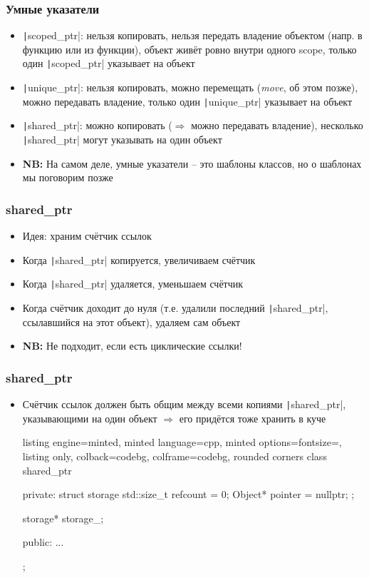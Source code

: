 \documentclass[10pt]{beamer}
\begin{document}
\begin{frame}[fragile]
\frametitle{Умные указатели}
\begin{itemize}
\item \texttt|scoped_ptr|: нельзя копировать, нельзя передать владение объектом (напр. в функцию или из функции), объект живёт ровно внутри одного scope, только один \texttt|scoped_ptr| указывает на объект
\pause
\item \texttt|unique_ptr|: нельзя копировать, можно перемещать (\textit{move}, об этом позже), можно передавать владение, только один \texttt|unique_ptr| указывает на объект
\pause
\item \texttt|shared_ptr|: можно копировать (\(\Longrightarrow\) можно передавать владение), несколько \texttt|shared_ptr| могут указывать на один объект
\pause
\item \textbf{NB:} На самом деле, умные указатели -- это шаблоны классов, но о шаблонах мы поговорим позже
\end{itemize}
\end{frame}

\begin{frame}[fragile]
\frametitle{shared\_ptr}
\begin{itemize}
\item Идея: храним счётчик ссылок
\pause
\item Когда \texttt|shared_ptr| копируется, увеличиваем счётчик
\pause
\item Когда \texttt|shared_ptr| удаляется, уменьшаем счётчик
\pause
\item Когда счётчик доходит до нуля (т.е. удалили последний \texttt|shared_ptr|, ссылавшийся на этот объект), удаляем сам объект
\pause
\item \textbf{NB:} Не подходит, если есть циклические ссылки!
\end{itemize}
\end{frame}

\begin{frame}[fragile]
\frametitle{shared\_ptr}
\begin{itemize}
\item Счётчик ссылок должен быть общим между всеми копиями \texttt|shared_ptr|, указывающими на один объект \(\Longrightarrow\) его придётся тоже хранить в куче
\begin{tcblisting}{listing engine=minted, minted language=cpp, minted options={fontsize=\scriptsize}, listing only, colback=codebg, colframe=codebg, rounded corners}
class shared_ptr {
private:
  struct storage {
    std::size_t refcount = 0;
    Object* pointer = nullptr;
  };

  storage* storage_;
  
public:
  ...
};
\end{tcblisting}
\end{itemize}
\end{frame}
\end{document}
